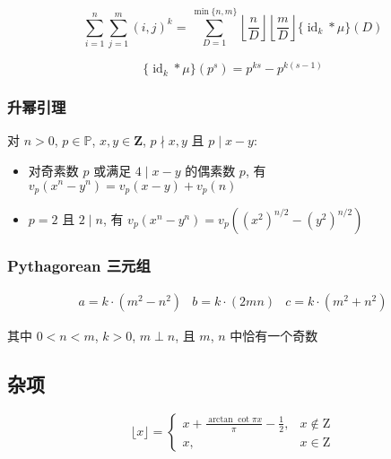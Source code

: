 \begin{equation}
    \sum_{i=1}^n\sum_{j=1}^m(i,j)^k=\sum_{D=1}^{\min\{n,m\}}\left\lfloor\frac{n}{D}\right\rfloor\left\lfloor\frac{m}{D}\right\rfloor\{\operatorname{id}_k*\mu\}(D)
\end{equation}

\begin{equation}
    \{\operatorname{id}_k*\mu\}(p^s)=p^{ks}-p^{k(s-1)}
\end{equation}

\subsubsection{升幂引理}

对 \(n>0\), \(p\in\mathbb{P}\), \(x,y\in\mathbf{Z}\), \(p\nmid x,y\) 且 \(p\mid x-y\):

\begin{itemize}
    \item 对奇素数 \(p\) 或满足 \(4\mid x-y\) 的偶素数 \(p\), 有 \(v_p\left(x^n-y^n\right)=v_p(x-y)+v_p(n)\)
    \item \(p=2\) 且 \(2\mid n\), 有 \(v_p\left(x^n-y^n\right)=v_p\left(\left(x^2\right)^{n/2}-\left(y^2\right)^{n/2}\right)\)
\end{itemize}

\subsubsection{Pythagorean 三元组}

\[
    \begin{array}{ccc}
        a=k\cdot\left(m^2-n^2\right)&b=k\cdot\left(2mn\right)&c=k\cdot\left(m^2+n^2\right)
    \end{array}
\]

其中 \(0<n<m\), \(k>0\), \(m\perp n\), 且 \(m\), \(n\) 中恰有一个奇数

\subsection{杂项}

\begin{equation}
    \lfloor x\rfloor=\begin{cases}
        \displaystyle x+\frac{\arctan\cot\pi x}{\pi}-\frac{1}{2}, & x\notin\mathrm{Z} \\
        x,                                                        & x\in\mathrm{Z}
    \end{cases}
\end{equation}

